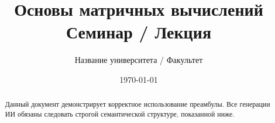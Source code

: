 
\newcommand{\R}{\mathbb{R}}
\renewcommand{\C}{\mathbb{C}}
\newcommand{\N}{\mathbb{N}}
\newcommand{\Z}{\mathbb{Z}}

\DeclareMathOperator{\rank}{rank}
\DeclareMathOperator{\tr}{tr}
\DeclareMathOperator{\diag}{diag}
\DeclareMathOperator{\im}{Im}
\undef\ker
\DeclareMathOperator{\ker}{Ker}
\DeclareMathOperator{\Span}{span}
\DeclareMathOperator{\cond}{cond}
\DeclareMathOperator{\sign}{sign}

\newcommand{\T}{^{\mathsf{T}}}
\newcommand{\Htrans}{^{\mathsf{H}}}
\let\H\Htrans

\DeclarePairedDelimiter{\abs}{\lvert}{\rvert}
\DeclarePairedDelimiter{\norm}{\lVert}{\rVert}
\DeclarePairedDelimiter{\inner}{\langle}{\rangle}
\DeclarePairedDelimiter{\ceil}{\lceil}{\rceil}
\DeclarePairedDelimiter{\floor}{\lfloor}{\rfloor}

\makeatletter
\let\oldabs\abs
\def\abs{\@ifstar{\oldabs}{\oldabs*}}
\let\oldnorm\norm
\def\norm{\@ifstar{\oldnorm}{\oldnorm*}}
\makeatother

\usepackage{import}


\title{\textbf{Основы матричных вычислений}\\ \Large Семинар / Лекция}
\author{Название университета / Факультет}
\date{\today}


\tableofcontents
\newpage
\maketitle


\begin{abstract}
    \noindent Данный документ демонстрирует корректное использование преамбулы.
    Все генерации ИИ обязаны следовать строгой семантической структуре,
    показанной ниже.
\end{abstract}

